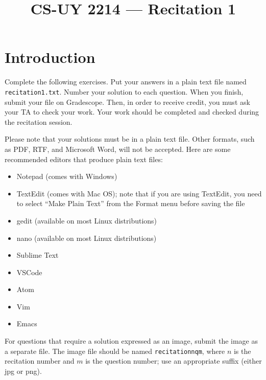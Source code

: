 \documentclass{article}
\begin{document}
\title{CS-UY 2214 — Recitation 1}
\date{}
\maketitle

\section*{Introduction}
Complete the following exercises. Put your answers in a plain text file named \texttt{recitation1.txt}. Number your solution to each question. When you finish, submit your file on Gradescope. Then, in order to receive credit, you must ask your TA to check your work. Your work should be completed and checked during the recitation session.

Please note that your solutions must be in a plain text file. Other formats, such as PDF, RTF, and Microsoft Word, will not be accepted. Here are some recommended editors that produce plain text files:
\begin{itemize}
    \item Notepad (comes with Windows)
    \item TextEdit (comes with Mac OS); note that if you are using TextEdit, you need to select “Make Plain Text” from the Format menu before saving the file
    \item gedit (available on most Linux distributions)
    \item nano (available on most Linux distributions)
    \item Sublime Text
    \item VSCode
    \item Atom
    \item Vim
    \item Emacs
\end{itemize}

For questions that require a solution expressed as an image, submit the image as a separate file. The image file should be named \texttt{recitationnqm}, where $n$ is the recitation number and $m$ is the question number; use an appropriate suffix (either jpg or png).
\end{document}
